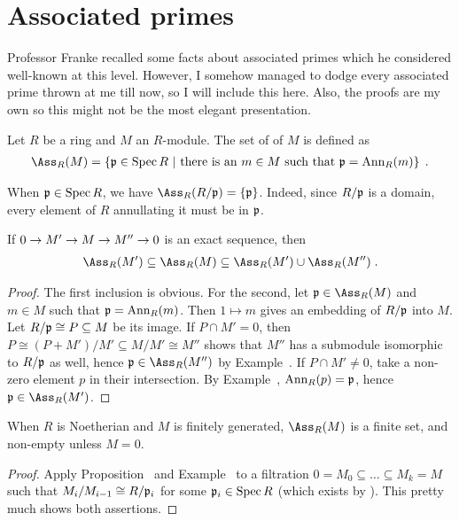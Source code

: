 \documentclass[a4paper,parskip=half,numbers=enddot, DIV=12]{scrreprt}
\begin{document}
\section{Associated primes}
Professor Franke recalled some facts about associated primes which he considered well-known at this level. However, I somehow managed to dodge every associated prime thrown at me till now, so I will include this here. Also, the proofs are my own so this might not be the most elegant presentation.
\begin{defi}
	Let $R$ be a ring and $M$ an $R$-module. The set of  of $M$ is defined as
	\begin{align*}
		\Ass_R(M)=\left\{\pp\in\Spec R\st\text{there is an }m\in M\text{ such that }\pp=\Ann_R(m)\right\}\;.
	\end{align*}
\end{defi}
\begin{example}
	When $\mathfrak{p}\in\operatorname{Spec} R$, we have $\Ass_R(R/\pp)=\left\{\pp\right\}$. Indeed, since $R/\mathfrak{p}$ is a domain, every element of $R$ annullating it must be in $\mathfrak{p}$.
\end{example}
\begin{prop}
	If $0\morphism M'\morphism M\morphism M''\morphism 0$ is an exact sequence, then
	\begin{align*}
		\Ass_R(M')\subseteq \Ass_R(M)\subseteq \Ass_R(M')\cup\Ass_R(M'')\;.
	\end{align*}
\end{prop}
\begin{proof}
	The first inclusion is obvious. For the second, let $\pp\in\Ass_R(M)$ and $m\in M$ such that $\mathfrak{p}=\operatorname{Ann}_R(m)$. Then $1\mapsto m$ gives an embedding of $R/\mathfrak{p}$ into $M$. Let $R/\mathfrak{p}\cong P\subseteq M$ be its image. If $P\cap M'=0$, then $P\cong (P+M')/M'\subseteq M/M'\cong M''$ shows that $M''$ has a submodule isomorphic to $R/\mathfrak{p}$ as well, hence $\pp\in\Ass_R(M'')$ by Example~. If $P\cap M'\neq 0$, take a non-zero element $p$ in their intersection. By Example~, $\operatorname{Ann}_R(p)=\mathfrak{p}$, hence $\pp\in\Ass_R(M')$.
\end{proof}
\begin{cor}
	When $R$ is Noetherian and $M$ is finitely generated, $\Ass_R(M)$ is a finite set, and non-empty unless $M=0$.
\end{cor}
\begin{proof}
	Apply Proposition~ and Example~ to a filtration $0=M_0\subseteq\ldots\subseteq M_k=M$ such that $M_i/M_{i-1}\cong R/\mathfrak{p}_i$ for some $\mathfrak{p}_i\in\operatorname{Spec} R$ (which exists by \cite[Proposition~3.1.2]{alg2}). This pretty much shows both assertions.
\end{proof}
\end{document}
